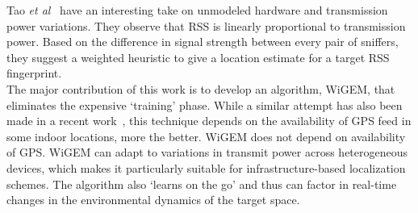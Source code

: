 Tao {\it et al}~\cite{Tao:2003:WLL:941311.941314} have an interesting take on unmodeled hardware and transmission power variations.  They observe that RSS is linearly proportional to transmission power. Based on the difference in signal strength between every pair of sniffers, they suggest a weighted heuristic to give a location estimate for a target RSS fingerprint.\\

 The major contribution of this work is to develop an algorithm, WiGEM, that eliminates the expensive `training' phase. 
While a similar attempt has also been made in a recent work~\cite{Chintalapudi:2010:ILW:1859995.1860016}, this technique depends on the availability of GPS feed in some indoor
locations, more the better. WiGEM does not depend on availability of GPS. 
%
WiGEM can adapt to variations in transmit power across heterogeneous devices, which makes it particularly suitable for infrastructure-based localization schemes. The algorithm also `learns on the go' and thus can factor in real-time changes in the environmental dynamics of the target space. 
